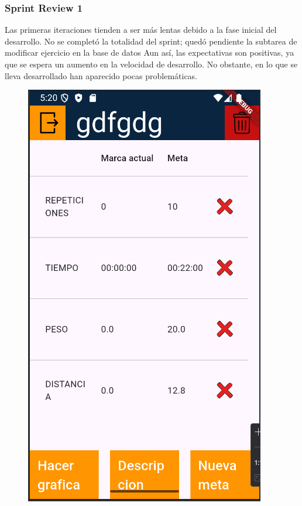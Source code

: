 \subsubsection{Sprint Review 1}
Las primeras iteraciones tienden a ser m\'as lentas debido a la fase inicial del desarrollo. No se complet\'o la totalidad del sprint; qued\'o pendiente la subtarea de modificar ejercicio en la base de datos %
Aun as\'i, las expectativas son positivas, ya que se espera un aumento en la velocidad de desarrollo. No obstante, en lo que se lleva  desarrollado han aparecido pocas problemáticas. %

\begin{figure}[h!]
  \centering
  \begin{minipage}[b]{0.45\textwidth}
    \centering
    \includegraphics[width=\textwidth]{fotos/ejerciciosNueva.png}

\end{minipage}
\end{figure}
